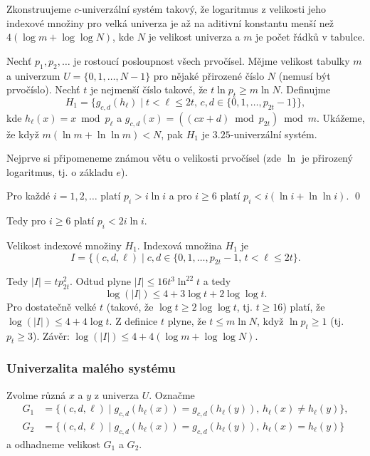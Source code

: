 \documentclass[a4paper,12pt]{article}
\begin{document}
Zkonstruujeme $c$-univerzální systém takový, 
že logaritmus z velikosti jeho indexové množiny pro velká 
univerza je až na aditivní konstantu menší než 
$4(\log m+\log\log N)$, kde $N$ je velikost univerza a $m$ je počet 
řádků v tabulce.  

Nechť $p_1,p_2,\dots$ je rostoucí posloupnost všech 
prvočísel. Měj\-me velikost tabulky $m$ a univerzum $U=
\{0,1,\dots,N-1\}$ pro 
nějaké přirozené číslo $N$ (nemusí být prvočíslo). Nechť $
t$ je 
nejmenší číslo takové, že $t\ln p_t\ge m\ln N$. Definujme 
$$H_1=\{g_{c,d}(h_{\ell})\mid t<\ell\le 2t,\,c,d\in \{0,1,\dots,p_{
2t}-1\}\},$$
kde $h_{\ell}(x)=x\bmod p_{\ell}$ a 
$g_{c,d}(x)=((cx+d)\bmod p_{2t})\bmod m$.\newline 
Ukážeme, že když $m(\ln m+\ln\ln m)<N$, pak $H_1$ je $
3.25$-univerzální systém. 

Nejprve si připomeneme známou větu o velikosti prvočísel 
(zde $\ln$ je přirozený logaritmus, tj. o základu $e$).

\begin{veta}Pro každé $i=1,2,\dots$ platí $p_i>i\ln 
i$ a pro $i\ge 6$ 
platí $p_i<i(\ln i+\ln\ln i)$. \qed
\end{veta}

Tedy pro $i\ge 6$ platí $p_i<2i\ln i$.

Velikost indexové množiny $H_1$.  Indexová množina $
H_1$ je 
$$I=\{(c,d,\ell )\mid c,d\in \{0,1,\dots,p_{2t}-1,\,t<\ell\le 2t\}
.$$
  
Tedy $|I|=tp_{2t}^2$.   
Odtud plyne $|I|\le 16t^3\ln^22t$ a tedy 
$$\log(|I|)\le 4+3\log t+2\log\log t.$$
Pro dostatečně velké $t$ (takové, že $\log t\ge 2\log\log 
t$, tj. $t\ge 16$) platí, 
že $\log(|I|)\le 4+4\log t$.  Z definice $t$ plyne, 
že $t\le m\ln N$, když $\ln p_t\ge 1$ (tj.  $p_t\ge 3$).\newline 
Závěr: $\log(|I|)\le 4+4(\log m+\log\log N)$. 

\subsubsection{Univerzalita malého systému}

Zvolme různá $x$ a $y$ z univerza $U$. 
Označme
\begin{align*} G_1&=\{(c,d,\ell )\mid g_{c,d}(h_{\ell}(x))=g_{c,d}(h_{\ell}
(y)),\,h_{\ell}(x)\ne h_{\ell}(y)\},\\
G_2&=\{(c,d,\ell )\mid g_{c,d}(h_{\ell}(x))=g_{c,d}(h_{\ell}(y)),\,
h_{\ell}(x)=h_{\ell}(y)\}\end{align*}
a odhadneme velikost $G_1$ a $G_2$. 
\end{document}
